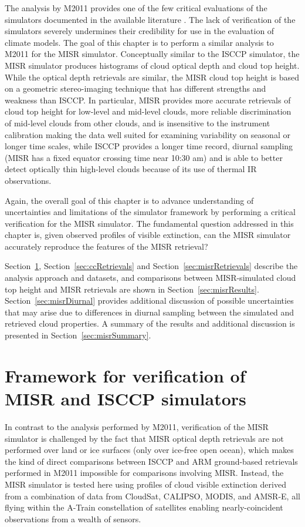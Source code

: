 The analysis by M2011 provides one of the few critical evaluations of
the simulators documented in the available literature \citep[see
also,][]{mace_et_al_2006, dimichele_et_al_2012}. The lack of
verification of the simulators severely undermines their credibility for
use in the evaluation of climate models. The goal of this chapter is to
perform a similar analysis to M2011 for the MISR simulator. Conceptually
similar to the ISCCP simulator, the MISR simulator produces histograms
of cloud optical depth and cloud top height. While the optical depth
retrievals are similar, the MISR cloud top height is based on a
geometric stereo-imaging technique that has different strengths and
weakness than ISCCP. In particular, MISR provides more accurate
retrievals of cloud top height for low-level and mid-level clouds, more
reliable discrimination of mid-level clouds from other clouds, and is
insensitive to the instrument calibration making the data well suited
for examining variability on seasonal or longer time scales, while ISCCP
provides a longer time record, diurnal sampling (MISR has a fixed
equator crossing time near 10:30 am) and is able to better detect
optically thin high-level clouds because of its use of thermal IR
observations.

Again, the overall goal of this chapter is to advance understanding of
uncertainties and limitations of the simulator framework by performing a
critical verification for the MISR simulator. The fundamental question
addressed in this chapter is, given observed profiles of visible
extinction, can the MISR simulator accurately reproduce the features of
the MISR retrieval?

Section~\ref{sec:framework}, Section~\ref{sec:ccRetrievals} and
Section~\ref{sec:misrRetrievals} describe the analysis approach and
datasets, and comparisons between MISR-simulated cloud top height and
MISR retrievals are shown in Section~\ref{sec:misrResults}.
Section~\ref{sec:misrDiurnal} provides additional discussion of possible
uncertainties that may arise due to differences in diurnal sampling
between the simulated and retrieved cloud properties. A summary of the
results and additional discussion is presented in
Section~\ref{sec:misrSummary}.

\section{Framework for verification of MISR and ISCCP
simulators}\label{sec:framework}

In contrast to the analysis performed by M2011, verification of the MISR
simulator is challenged by the fact that MISR optical depth retrievals
are not performed over land or ice surfaces (only over ice-free open
ocean), which makes the kind of direct comparisons between ISCCP and ARM
ground-based retrievals performed in M2011 impossible for comparisons
involving MISR. Instead, the MISR simulator is tested here using
profiles of cloud visible extinction derived from a combination of data
from CloudSat, CALIPSO, MODIS, and AMSR-E, all flying within the A-Train
constellation of satellites enabling nearly-coincident observations from
a wealth of sensors.

